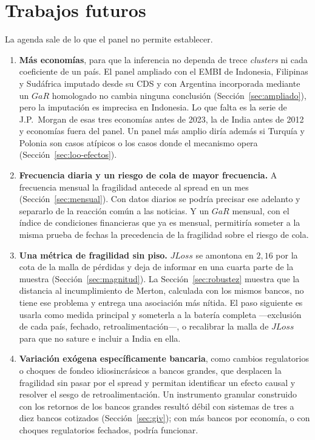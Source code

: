 \chapter{Trabajos futuros}
\label{sec:agenda-futura}

La agenda sale de lo que el panel no permite establecer.

\begin{enumerate}
\item \textbf{Más economías}, para que la inferencia no dependa de trece \textit{clusters} ni cada coeficiente de un país. El panel ampliado con el EMBI de Indonesia, Filipinas y Sudáfrica imputado desde su CDS y con Argentina incorporada mediante un $GaR$ homologado no cambia ninguna conclusión (Sección~\ref{sec:ampliado}), pero la imputación es imprecisa en Indonesia. Lo que falta es la serie de J.P.\ Morgan de esas tres economías antes de 2023, la de India antes de 2012 y economías fuera del panel. Un panel más amplio diría además si Turquía y Polonia son casos atípicos o los casos donde el mecanismo opera (Sección~\ref{sec:loo-efectos}).
\item \textbf{Frecuencia diaria y un riesgo de cola de mayor frecuencia.} A frecuencia mensual la fragilidad antecede al spread en un mes (Sección~\ref{sec:mensual}). Con datos diarios se podría precisar ese adelanto y separarlo de la reacción común a las noticias. Y un $GaR$ mensual, con el índice de condiciones financieras que ya es mensual, permitiría someter a la misma prueba de fechas la precedencia de la fragilidad sobre el riesgo de cola.
\item \textbf{Una métrica de fragilidad sin piso.} $JLoss$ se amontona en $2{,}16$ por la cota de la malla de pérdidas y deja de informar en una cuarta parte de la muestra (Sección~\ref{sec:magnitud}). La Sección~\ref{sec:robustez} muestra que la distancia al incumplimiento de Merton, calculada con los mismos bancos, no tiene ese problema y entrega una asociación más nítida. El paso siguiente es usarla como medida principal y someterla a la batería completa ---exclusión de cada país, fechado, retroalimentación---, o recalibrar la malla de $JLoss$ para que no sature e incluir a India en ella.
\item \textbf{Variación exógena específicamente bancaria}, como cambios regulatorios o choques de fondeo idiosincrásicos a bancos grandes, que desplacen la fragilidad sin pasar por el spread y permitan identificar un efecto causal y resolver el sesgo de retroalimentación. Un instrumento granular construido con los retornos de los bancos grandes resultó débil con sistemas de tres a diez bancos cotizados (Sección~\ref{sec:giv}); con más bancos por economía, o con choques regulatorios fechados, podría funcionar.

\end{enumerate}
